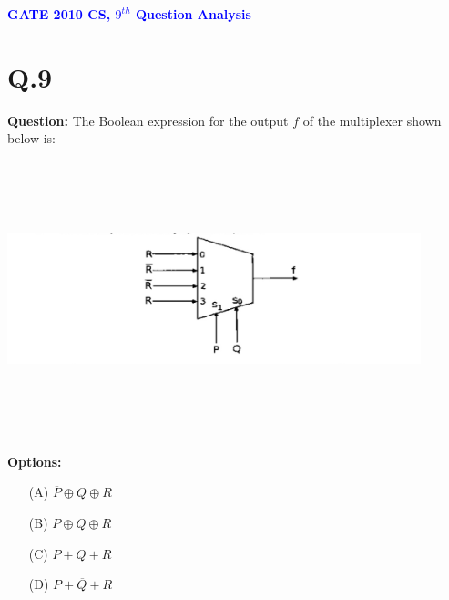 \documentclass[a4paper,12pt]{article}
\begin{document}
\thispagestyle{fancy}
\fancyhf{}
\renewcommand{\headrulewidth}{0pt}
\fancyfoot[C]{\thepage}

\vspace*{1cm}
\begin{center}
    {\LARGE \textbf{\textcolor{blue}{GATE 2010 CS, $9^{th}$ Question Analysis}}}
\end{center}

\section*{Q.9}

\textbf{Question:} The Boolean expression for the output \( f \) of the multiplexer shown below is:
\begin{center}
	\includegraphics[width=12cm, height=8cm]{circuit.jpg}
\end{center}
\textbf{Options:}
\begin{enumerate}
\item[(A)] \( \overline{P} \oplus Q \oplus R \)
\item[(B)] \( P \oplus Q \oplus R \)
\item[(C)] \( P + Q + R \)
\item[(D)] \( \overline{P + Q + R} \)
\end{enumerate}
\end{document}
